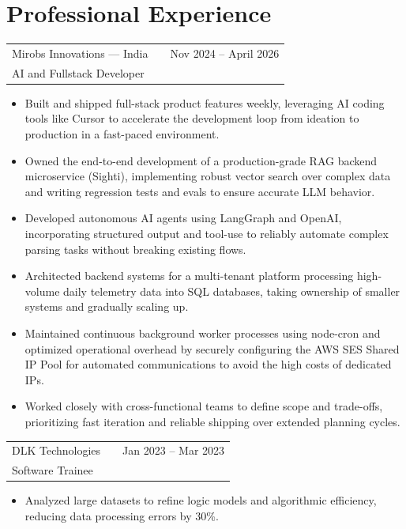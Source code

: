 \documentclass[a4paper,10pt]{article}
\begin{document}
\section{Professional Experience}
\begin{tabularx}{\linewidth}{ @{}l X r@{} }
Mirobs Innovations — India & & Nov 2024 -- April 2026 \\
AI and Fullstack Developer & & \\
\end{tabularx}
\begin{itemize}[nosep, leftmargin=1.5em, itemsep=2pt, parsep=0pt]
\item Built and shipped full-stack product features weekly, leveraging AI coding tools like Cursor to accelerate the development loop from ideation to production in a fast-paced environment.
\item Owned the end-to-end development of a production-grade RAG backend microservice (Sighti), implementing robust vector search over complex data and writing regression tests and evals to ensure accurate LLM behavior.
\item Developed autonomous AI agents using LangGraph and OpenAI, incorporating structured output and tool-use to reliably automate complex parsing tasks without breaking existing flows.
\item Architected backend systems for a multi-tenant platform processing high-volume daily telemetry data into SQL databases, taking ownership of smaller systems and gradually scaling up.
\item Maintained continuous background worker processes using node-cron and optimized operational overhead by securely configuring the AWS SES Shared IP Pool for automated communications to avoid the high costs of dedicated IPs.
\item Worked closely with cross-functional teams to define scope and trade-offs, prioritizing fast iteration and reliable shipping over extended planning cycles.
\end{itemize}

\vspace{4pt}
\begin{tabularx}{\linewidth}{ @{}l X r@{} }
DLK Technologies & & Jan 2023 -- Mar 2023 \\
Software Trainee & & \\
\end{tabularx}
\begin{itemize}[nosep, leftmargin=1.5em, itemsep=2pt, parsep=0pt]
\item Analyzed large datasets to refine logic models and algorithmic efficiency, reducing data processing errors by 30\%.
\end{itemize}
\end{document}
